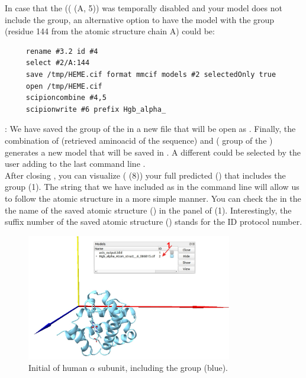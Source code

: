 In case that the   (( (A, 5)) was temporally disabled and your model does not include the  group, an alternative option to have the model with the  group (residue 144 from the atomic structure  chain A) could be:
\begin{verbatim}
     rename #3.2 id #4
     select #2/A:144
     save /tmp/HEME.cif format mmcif models #2 selectedOnly true 
     open /tmp/HEME.cif
     scipioncombine #4,5 
     scipionwrite #6 prefix Hgb_alpha_
 \end{verbatim}
 : We have saved the  group of the   in a new file that will be open as  . Finally, the combination of   (retrieved aminoacid  of the  sequence) and  ( group of the  ) generates a new model  that will be saved in \scipion. A different  could be selected by the user adding to the last command line .\\


After closing \chimera, you can visualize ( (8)) your full predicted  () that includes the  group (1).  The string that we have included as  in the command line  will allow us to follow the atomic structure in a more simple manner. You can check the  in the the name of the saved atomic structure () in the  panel of  (1). Interestingly, the suffix number of the saved atomic structure () stands for the ID protocol number.
 
 \begin{figure}[H]
  \centering 
  \captionsetup{width=.9\linewidth} 
  \includegraphics[width=0.80\textwidth]{Images/Fig16}
  \caption{Initial  of human  $\alpha$ subunit, including the  group (blue).}
  \label{fig:chimera_model}
  \end{figure}
  
